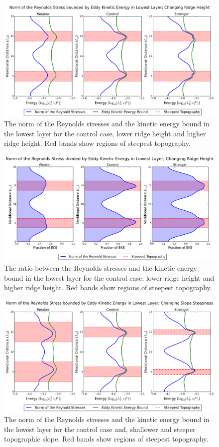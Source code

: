\documentclass[12pt,a4paper]{report}
\begin{document}
\begin{figure}
	\centering
	\includegraphics[width=\linewidth]{ekebound_1_1}
	\caption{ The norm of the Reynolds stresses and the kinetic energy bound in
		the lowest layer for the control case, lower ridge height and higher ridge height.  Red bands show regions of steepest topography.}
	\label{fig:ekeboundheight}
\end{figure}

\begin{figure}
	\centering
	\includegraphics[width=\linewidth]{normovereke_1_1}
	\caption{The ratio between the Reynolds stresses and the kinetic energy bound in
		the lowest layer for the control case, lower ridge height and higher ridge height.  Red bands show regions of steepest topography. }
	\label{fig:normoverekeheight}
\end{figure}


\begin{figure}
	\centering
	\includegraphics[width=\linewidth]{ekebound_2_1}
	\caption{ The norm of the Reynolds stresses and the kinetic energy bound in
		the lowest layer for the control case and, shallower and steeper topographic slope.  Red bands show regions of steepest topography.}
	\label{fig:ekeboundwidth}
\end{figure}
\end{document}
